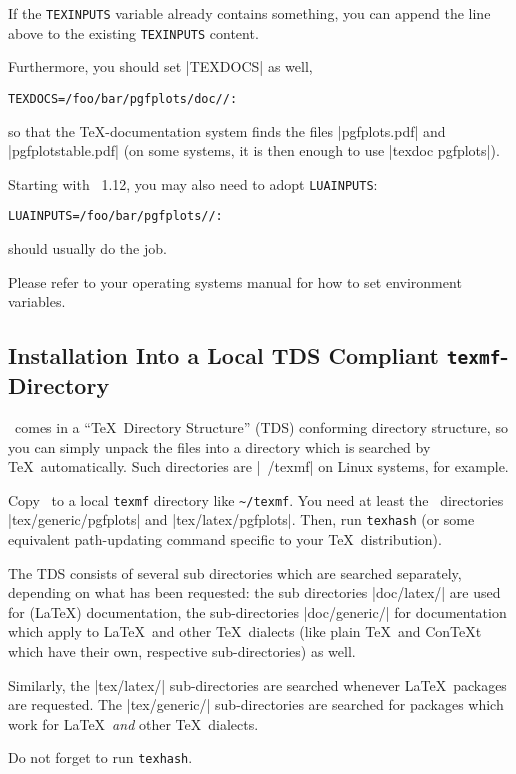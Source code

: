 If the \texttt{TEXINPUTS} variable already contains something, you can append the line above to the existing \texttt{TEXINPUTS} content.

Furthermore, you should set |TEXDOCS| as well,
\begin{verbatim}
TEXDOCS=/foo/bar/pgfplots/doc//:
\end{verbatim}
so that the \TeX-documentation system finds the files |pgfplots.pdf| and |pgfplotstable.pdf| (on some systems, it is then enough to use |texdoc pgfplots|).

Starting with \PGFPlots\ 1.12, you may also need to adopt \texttt{LUAINPUTS}:
\begin{verbatim}
LUAINPUTS=/foo/bar/pgfplots//:
\end{verbatim}
should usually do the job.

Please refer to your operating systems manual for how to set environment variables.

\subsection{Installation Into a Local TDS Compliant \texttt{texmf}-Directory}
\label{pgfplots:tds}
\PGFPlots\ comes in a ``\TeX\ Directory Structure'' (TDS) conforming directory structure, so you can simply unpack the files into a directory which is searched by \TeX\ automatically. Such directories are |~/texmf| on Linux systems, for example.

Copy \PGFPlots\ to a local \texttt{texmf} directory like \lstinline!~/texmf!. You need at least the \PGFPlots\ directories |tex/generic/pgfplots| and |tex/latex/pgfplots|. Then, run \lstinline!texhash! (or some equivalent path-updating command specific to your \TeX\ distribution).

The TDS consists of several sub directories which are searched separately, depending on what has been requested: the sub directories |doc/latex/| are used for (\LaTeX) documentation, the sub-directories |doc/generic/| for documentation which apply to \LaTeX\ and other \TeX\ dialects (like plain \TeX\ and Con\TeX t which have their own, respective sub-directories) as well.

Similarly, the |tex/latex/| sub-directories are searched whenever \LaTeX\ packages are requested. The |tex/generic/| sub-directories are searched for packages which work for \LaTeX\ \emph{and} other \TeX\ dialects.

Do not forget to run \lstinline!texhash!.

